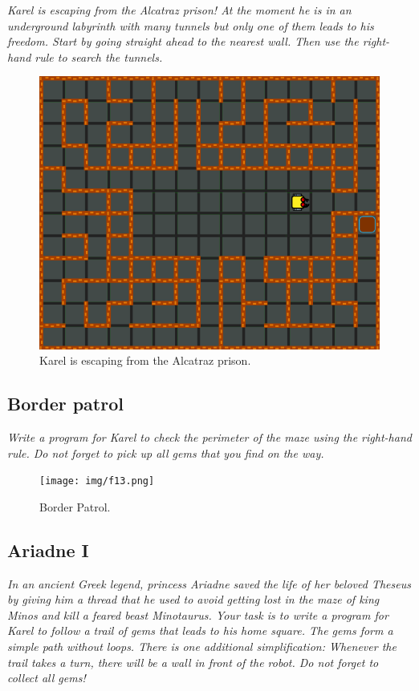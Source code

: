 {\em Karel is escaping from the Alcatraz prison! At the moment he is in an underground labyrinth with many tunnels but only one of them leads to his freedom. Start by going straight ahead to the nearest wall. Then use the right-hand rule to search the tunnels.}\\[-7mm]

\begin{figure}[!ht]
\begin{center}
\includegraphics[height=0.4\textwidth]{img/f12.png}
\end{center}
\vspace{-4mm}
\caption{Karel is escaping from the Alcatraz prison.}
\label{fig:f12}
\vspace{-1cm}
\end{figure}
\newpage


\subsection{Border patrol}

{\em Write a program for Karel to check the perimeter of the maze using the 
right-hand rule. Do not forget to pick up all gems that you find on the way.}

\begin{figure}[!ht]
\begin{center}
\texttt{[image: img/f13.png]}
\end{center}
\vspace{-4mm}
\caption{Border Patrol.}
\label{fig:f13}
\vspace{-1cm}
\end{figure}

\newpage


\subsection{Ariadne I}

{\em In an ancient Greek legend, princess Ariadne saved the life of her beloved Theseus by giving him a thread that he used to avoid getting lost in the maze of king Minos and kill a feared beast Minotaurus. Your task is to write a program for Karel to follow a trail of gems that leads to his home square. The gems form a simple path without loops. There is one additional simplification: Whenever the trail takes a turn, there will be a wall in front of the robot. Do not forget to collect all gems!}


